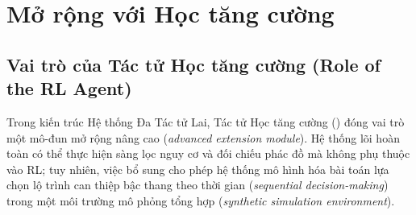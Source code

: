 \chapter{Mở rộng với Học tăng cường}
\label{chap:rl}

\section{Vai trò của Tác tử Học tăng cường (Role of the RL Agent)}
\label{sec:rl-role}

Trong kiến trúc Hệ thống Đa Tác tử Lai, Tác tử Học tăng cường () đóng vai trò một mô-đun mở rộng nâng cao (\emph{advanced extension module}). Hệ thống lõi hoàn toàn có thể thực hiện sàng lọc nguy cơ và đối chiếu phác đồ mà không phụ thuộc vào RL; tuy nhiên, việc bổ sung  cho phép hệ thống mô hình hóa bài toán lựa chọn lộ trình can thiệp bậc thang theo thời gian (\emph{sequential decision-making}) trong một môi trường mô phỏng tổng hợp (\emph{synthetic simulation environment}).

